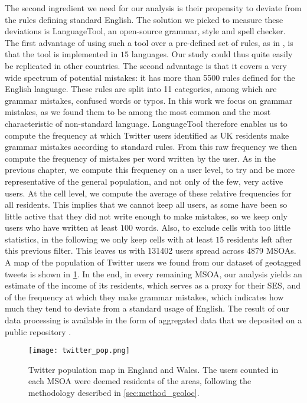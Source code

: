 \documentclass[../thesis.tex]{subfiles}
\begin{document}
The second ingredient we need for our analysis is their propensity to deviate from the
rules defining standard English. The solution we picked to measure these deviations is
LanguageTool, an open-source grammar, style and spell checker. The first advantage of
using such a tool over a pre-defined set of rules, as in
\cite{AbitbolSocioeconomicDependencies2018}, is that the tool is implemented in $15$
languages. Our study could thus quite easily be replicated in other countries. The
second advantage is that it covers a very wide spectrum of potential mistakes: it has
more than \SI{5500}{} rules defined for the English language. These rules are split into
11 categories, among which are grammar mistakes, confused words or typos. In this work
we focus on grammar mistakes, as we found them to be among the most common and the most
characteristic of non-standard language. LanguageTool therefore enables us to compute
the frequency at which Twitter users identified as UK residents make grammar mistakes
according to standard rules. From this raw frequency we then compute the frequency of
mistakes per word written by the user. As in the previous chapter, we compute this
frequency on a user level, to try and be more representative of the general population,
and not only of the few, very active users. At the cell level, we compute the average of
these relative frequencies for all residents. This implies that we cannot keep all
users, as some have been so little active that they did not write enough to make
mistakes, so we keep only users who have written at least $100$ words. Also, to exclude
cells with too little statistics, in the following we only keep cells with at least $15$
residents left after this previous filter. This leaves us with \SI{131402}{} users
spread across \SI{4879}{} \acp{MSOA}. A map of the population of Twitter users we found
from our dataset of geotagged tweets is shown in \cref{fig:EW_twitter_pop}. In the end,
in every remaining \ac{MSOA}, our analysis yields an estimate of the income of its
residents, which serves as a proxy for their \ac{SES}, and of the frequency at which
they make grammar mistakes, which indicates how much they tend to deviate from a
standard usage of English. The result of our data processing is available in the form of
aggregated data that we deposited on a public repository
\cite{LoufFrequencyDetected2023}.
\begin{figure}
\centering
  \texttt{[image: twitter\_pop.png]}
  \caption{Twitter population map in England and Wales. The users counted in each
  \ac{MSOA} were deemed residents of the areas, following the methodology described in
  \cref{sec:method_geoloc}.}
  \label{fig:EW_twitter_pop}
\end{figure}
\end{document}
